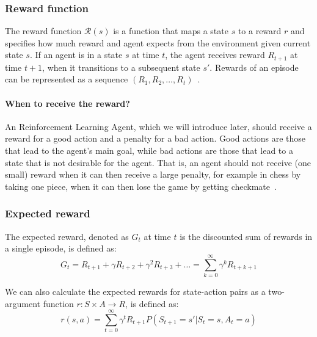 \documentclass[../xlapes02]{subfiles}
\begin{document}
    \subsubsection{Reward function}\label{par:reward-function}
    The reward function $\mathcal{R}(s)$ is a function that maps a state $s$ to a reward $r$ and specifies how much reward and agent expects from the environment given current state $s$. If an agent is in a state $s$ at time $t$, the agent receives reward  $R_{t+1}$  at time $t + 1$,  when it transitions to a subsequent state $s'$. Rewards of an episode can be represented as a sequence $(R_1, R_2, \ldots, R_t)$~\cite{FITMT25127}.

    \paragraph{When to receive the reward?} An Reinforcement Learning Agent, which we will introduce later, should receive a reward for a good action and a penalty for a bad action. Good actions are those that lead to the agent's main goal, while bad actions are those that lead to a state that is not desirable for the agent. That is, an agent should not receive (one small) reward when it can then receive a large penalty, for example in chess by taking one piece, when it can then lose the game by getting checkmate~\cite{sutton2018reinforcement}.

    \subsubsection{Expected reward}\label{par:expected-reward}
    The expected reward, denoted as $G_t$ at time $t$ is the discounted sum of rewards in a single episode, is defined as:
    \begin{equation}
        G_t=R_{t+1}+\gamma R_{t+2}+\gamma^2 R_{t+3}+\ldots=\sum_{k=0}^{\infty}\gamma^k R_{t+k+1}
    \end{equation}

    We can also calculate the expected rewards for state-action pairs as a two-argument function $r:S\times A\to R$, is defined as:
    \begin{equation}
        r(s,a)=\sum_{t=0}^{\infty}\gamma^t R_{t+1} P(S_{t+1}=s'|S_t=s,A_t=a)
    \end{equation}
\end{document}
